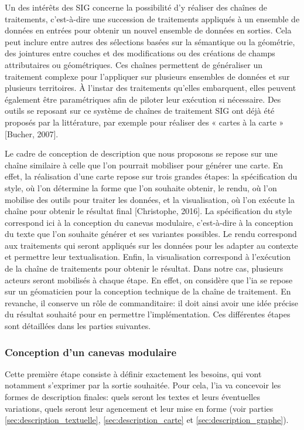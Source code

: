 \newpar{}

Un des intérêts des SIG concerne la possibilité d’y réaliser des chaînes de traitements, c’est-à-dire une succession de traitements appliqués à un ensemble de données en entrées pour obtenir un nouvel ensemble de données en sorties. Cela peut inclure entre autres des sélections basées sur la sémantique ou la géométrie, des jointures entre couches et des modifications ou des créations de champs attributaires ou géométriques. Ces chaînes permettent de généraliser un traitement complexe pour l’appliquer sur plusieurs ensembles de données et sur plusieurs territoires. À l’instar des traitements qu’elles embarquent, elles peuvent également être paramétriques afin de piloter leur exécution si nécessaire. Des outils se reposant sur ce système de chaînes de traitement SIG ont déjà été proposés par la littérature, par exemple pour réaliser des « cartes à la carte » [Bucher, 2007].

\newpar{}

Le cadre de conception de description que nous proposons se repose sur une chaîne similaire à celle que l’on pourrait mobiliser pour générer une carte. En effet, la réalisation d’une carte repose sur trois grandes étapes: la spécification du style, où l’on détermine la forme que l’on souhaite obtenir, le rendu, où l’on mobilise des outils pour traiter les données, et la visualisation, où l’on exécute la chaîne pour obtenir le résultat final [Christophe, 2016]. La spécification du style correspond ici à la conception du canevas modulaire, c’est-à-dire à la conception du texte que l’on souhaite générer et ses variantes possibles. Le rendu correspond aux traitements qui seront appliqués sur les données pour les adapter au contexte et permettre leur textualisation. Enfin, la visualisation correspond à l’exécution de la chaîne de traitements pour obtenir le résultat. Dans notre cas, plusieurs acteurs seront mobilisés à chaque étape. En effet, on considère que l’\gls{ia} se repose sur un géomaticien pour la conception technique de la chaîne de traitement. En revanche, il conserve un rôle de commanditaire: il doit ainsi avoir une idée précise du résultat souhaité pour en permettre l’implémentation. Ces différentes étapes sont détaillées dans les parties suivantes.

\subsubsection{Conception d'un canevas modulaire}

Cette première étape consiste à définir exactement les besoins, qui vont notamment s’exprimer par la sortie souhaitée. Pour cela, l’\gls{ia} va concevoir les formes de description finales: quels seront les textes et leurs éventuelles variations, quels seront leur agencement et leur mise en forme (voir parties \ref{sec:description_textuelle}, \ref{sec:description_carte} et \ref{sec:description_graphe}).

